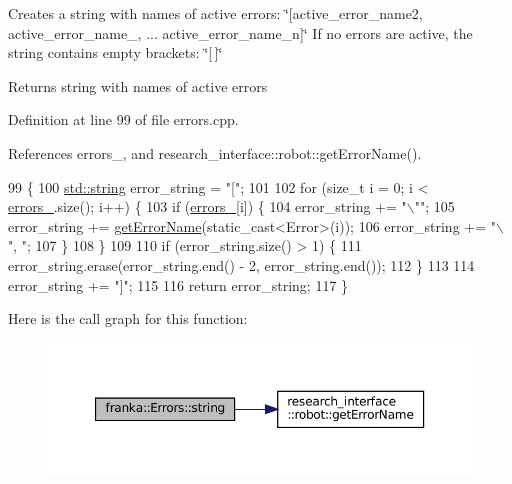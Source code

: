 Creates a string with names of active errors\+: \char`\"{}\mbox{[}active\+\_\+error\+\_\+name2, active\+\_\+error\+\_\+name\+\_, ... active\+\_\+error\+\_\+name\+\_\+n\mbox{]}\char`\"{} If no errors are active, the string contains empty brackets\+: \char`\"{}\mbox{[}$\,$\mbox{]}\char`\"{}

\begin{DoxyReturn}{Returns}
string with names of active errors 
\end{DoxyReturn}


Definition at line 99 of file errors.\+cpp.



References errors\+\_\+, and research\+\_\+interface\+::robot\+::get\+Error\+Name().


\begin{DoxyCode}
99                                  \{
100   \hyperlink{namespacetesting_1_1internal_a8e8ff5b11e64078831112677156cb111}{std::string} error\_string = \textcolor{stringliteral}{"["};
101 
102   \textcolor{keywordflow}{for} (\textcolor{keywordtype}{size\_t} i = 0; i < \hyperlink{structfranka_1_1Errors_ab269bb0ad30eb1aaa7009a246be8e8aa}{errors\_}.size(); i++) \{
103     \textcolor{keywordflow}{if} (\hyperlink{structfranka_1_1Errors_ab269bb0ad30eb1aaa7009a246be8e8aa}{errors\_}[i]) \{
104       error\_string += \textcolor{stringliteral}{"\(\backslash\)""};
105       error\_string += \hyperlink{namespaceresearch__interface_1_1robot_a95920f2181aaff8df4949bc7d9036a2f}{getErrorName}(static\_cast<Error>(i));
106       error\_string += \textcolor{stringliteral}{"\(\backslash\)", "};
107     \}
108   \}
109 
110   \textcolor{keywordflow}{if} (error\_string.size() > 1) \{
111     error\_string.erase(error\_string.end() - 2, error\_string.end());
112   \}
113 
114   error\_string += \textcolor{stringliteral}{"]"};
115 
116   \textcolor{keywordflow}{return} error\_string;
117 \}
\end{DoxyCode}
Here is the call graph for this function\+:
\nopagebreak
\begin{figure}[H]
\begin{center}
\leavevmode
\includegraphics[width=350pt]{structfranka_1_1Errors_a63ed1948f69db5be95a9c70107955d68_cgraph}
\end{center}
\end{figure}
\mbox{\label{structfranka_1_1Errors_a6c8a5f57fd238a83d112268764219bc9}} 
